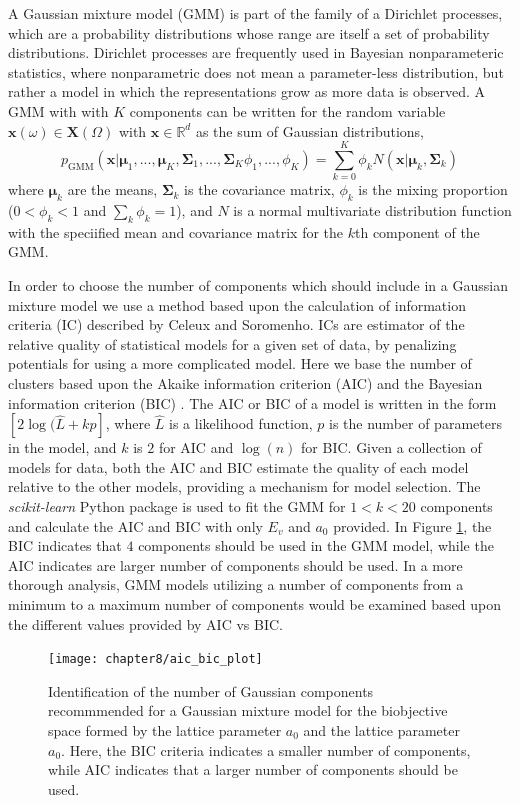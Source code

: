 A Gaussian mixture model (GMM) is part of the family of a Dirichlet processes, which are a probability distributions whose range are itself a set of probability distributions.\cite{west1994_mixturemodel}
Dirichlet processes are frequently used in Bayesian nonparameteric statistics, where nonparametric does not mean a parameter-less distribution, but rather a model in which the representations grow as more data is observed.
A GMM with with $K$ components can be written for the random variable $\bm{x}(\omega) \in \bm{X}(\Omega)$ with $\bm{x} \in \mathbb{R}^d$ as the sum of Gaussian distributions,
\begin{equation}
\label{eq:gmm}
  p_{\text{GMM}}(\bm{x}|
                 \bm{\mu}_1,...,\bm{\mu}_K,
                 \bm{\Sigma}_1,...,\bm{\Sigma}_K
                 \phi_1,...,\phi_K)
  =
  \sum_{k=0}^K \phi_k N(\bm{x}|\bm{\mu}_k,\bm{\Sigma}_k)
\end{equation}
where $\bm{\mu}_k$ are the means, $\bm{\Sigma}_k$ is the covariance matrix, $\phi_k$ is the mixing proportion ($0<\phi_k<1$ and $\sum_k \phi_k = 1$), and $N$ is a normal multivariate distribution function with the speciified mean and covariance matrix for the $k$th component of the GMM.

In order to choose the number of components which should include in a Gaussian mixture model we use a method based upon the calculation of information criteria (IC) described by Celeux and Soromenho\cite{celeux1996_gmm_components}.
ICs are estimator of the relative quality of statistical models for a given set of data, by penalizing potentials for using a more complicated model.
Here we base the number of clusters based upon the Akaike information criterion (AIC)\cite{akaike1998_aic} and the Bayesian information criterion (BIC) \cite{schwarz1978_bic}.
The AIC or BIC of a model is written in the form $[2\log(\hat{L}+kp]$, where $\hat{L}$ is a likelihood function, $p$ is the number of parameters in the model, and $k$ is $2$ for AIC and $\log(n)$ for BIC.
Given a collection of models for data, both the AIC and BIC estimate the quality of each model relative to the other models, providing a mechanism for model selection.
The \emph{scikit-learn} Python package\cite{pedregosa2011_scikitlearn} is used to fit the GMM for $1 < k < 20$ components and calculate the AIC and BIC with only $E_v$ and $a_0$ provided.
In Figure \ref{fig:Si_Ec_a0_aic_bic}, the BIC indicates that $4$ components should be used in the GMM model, while the AIC indicates are larger number of components should be used.
In a more thorough analysis, GMM models utilizing a number of components from a minimum to a maximum number of components would be examined based upon the different values provided by AIC vs BIC.
\begin{figure}[ht]
	\centering
	\texttt{[image: chapter8/aic\_bic\_plot]}
	\caption{Identification of the number of Gaussian components recommmended for a Gaussian mixture model for the biobjective space formed by the lattice parameter $a_0$ and the lattice parameter $a_0$.  Here, the BIC criteria indicates a smaller number of components, while AIC indicates that a larger number of components should be used.}
	\label{fig:Si_Ec_a0_aic_bic}
\end{figure}

